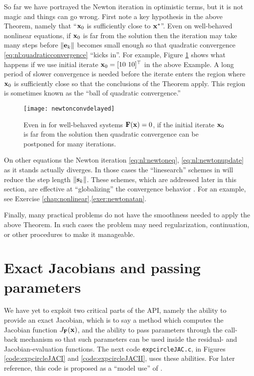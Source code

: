 So far we have portrayed the Newton iteration in optimistic terms, but it is not magic and things can go wrong.  First note a key hypothesis in the above Theorem, namely that ``$\mathbf{x}_0$ is sufficiently close to $\mathbf{x}^*$''.  Even on well-behaved nonlinear equations, if $\mathbf{x}_0$ is far from the solution then the iteration may take many steps before $\|\mathbf{e}_k\|$ becomes small enough so that quadratic convergence \eqref{eq:nl:quadraticconvergence} ``kicks in''.  For example, Figure \ref{fig:newtonconvdelayed} shows what happens if we use initial iterate $\mathbf{x}_0=[10\,\, 10]^\top$ in the above Example.  A long period of slower convergence is needed before the iterate enters the region where $\mathbf{x}_0$ is sufficiently close so that the conclusions of the Theorem apply.  This region is sometimes known as the ``ball of quadratic convergence.''

\begin{figure}
\texttt{[image: newtonconvdelayed]}
\caption{Even in for well-behaved systems $\mathbf{F}(\mathbf{x})=0$, if the initial iterate $\mathbf{x}_0$ is far from the solution then quadratic convergence can be postponed for many iterations.}
\label{fig:newtonconvdelayed}
\end{figure}

On other equations the Newton iteration \eqref{eq:nl:newtoneq}, \eqref{eq:nl:newtonupdate} as it stands actually diverges.  In those cases the ``linesearch'' schemes in \PETSc will reduce the step length $\|\mathbf{s}_k\|$.  These schemes, which are addressed later in this section, are effective at ``globalizing'' the convergence behavior \citep{Kelley2003}.  For an example, see Exercise \ref{chap:nonlinear}.\ref{exer:newtonatan}.

Finally, many practical problems do not have the smoothness needed to apply the above Theorem.  In such cases the problem may need regularization, continuation, or other procedures to make it manageable.


\section{Exact Jacobians and passing parameters}

We have yet to exploit two critical parts of the \pSNES API, namely the ability to provide an exact Jacobian, which is to say a method which computes the Jacobian function $J_{\mathbf{F}}(\mathbf{x})$, and the ability to pass parameters through the call-back mechanism so that such parameters can be used inside the residual- and Jacobian-evaluation functions.  The next code \texttt{expcircleJAC.c}, in Figures \ref{code:expcircleJACI} and \ref{code:expcircleJACII}, uses these abilities.  For later reference, this code is proposed as a ``model use'' of \pSNES.

